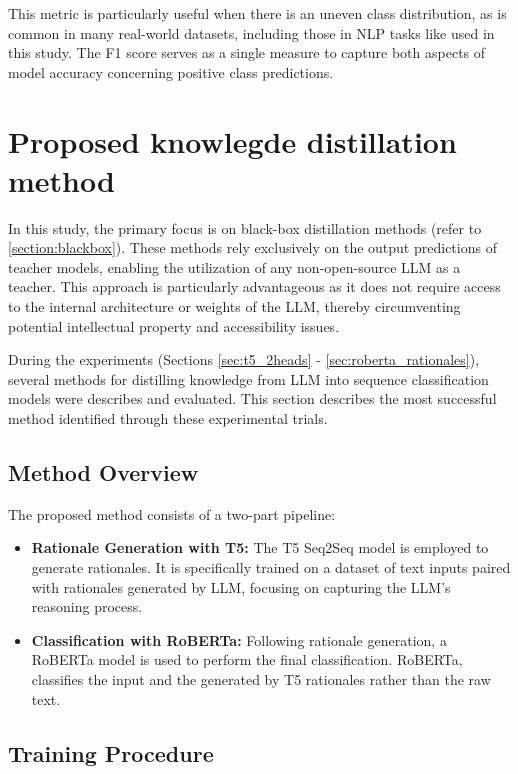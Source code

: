 This metric is particularly useful when there is an uneven class distribution, as is common in many real-world datasets, including those in NLP tasks like used in this study. The F1 score serves as a single measure to capture both aspects of model accuracy concerning positive class predictions.


\section{Proposed knowlegde distillation method}
\label{sec:proposed_method}

In this study, the primary focus is on black-box distillation methods (refer to \autoref{section:blackbox}). These methods rely exclusively on the output predictions of teacher models, enabling the utilization of any non-open-source LLM as a teacher. This approach is particularly advantageous as it does not require access to the internal architecture or weights of the LLM, thereby circumventing potential intellectual property and accessibility issues.

During the experiments (Sections \ref{sec:t5_2heads} - \ref{sec:roberta_rationales}), several methods for distilling knowledge from LLM into sequence classification models were describes and evaluated. This section describes the most successful method identified through these experimental trials.

\subsection*{Method Overview}

The proposed method consists of a two-part pipeline:
\begin{itemize}
    \item \textbf{Rationale Generation with T5:} The T5 Seq2Seq model is employed to generate rationales. It is specifically trained on a dataset of text inputs paired with rationales generated by LLM, focusing on capturing the LLM's reasoning process.
    \item \textbf{Classification with RoBERTa:} Following rationale generation, a RoBERTa model is used to perform the final classification. RoBERTa, classifies the input and the generated by T5 rationales rather than the raw text.
\end{itemize}

\subsection*{Training Procedure}

